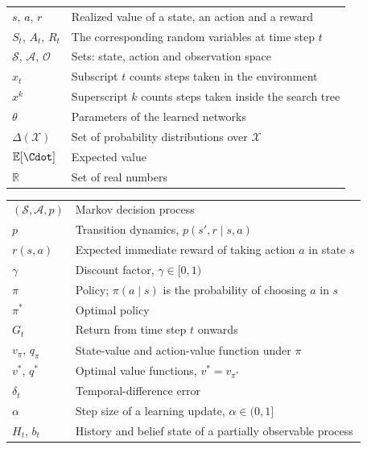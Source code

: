 %



\begin{tabular}{p{2.5cm} p{11cm}}
$s$, $a$, $r$ & Realized value of a state, an action and a reward \\
$S_t$, $A_t$, $R_t$ & The corresponding random variables at time step $t$ \\
$\mathcal{S}$, $\mathcal{A}$, $\mathcal{O}$ & Sets: state, action and observation space \\
$x_t$ & Subscript $t$ counts steps taken in the environment \\
$x^k$ & Superscript $k$ counts steps taken inside the search tree \\
$\theta$ & Parameters of the learned networks \\
$\Delta(\mathcal{X})$ & Set of probability distributions over $\mathcal{X}$ \\
$\mathbb{E}[\Cdot]$ & Expected value \\
$\mathbb{R}$ & Set of real numbers \\
\end{tabular}


\begin{tabular}{p{2.5cm} p{11cm}}
$(\mathcal{S},\mathcal{A},p)$ & Markov decision process \\
$p$ & Transition dynamics, $p(s',r \mid s,a)$ \\
$r(s,a)$ & Expected immediate reward of taking action $a$ in state $s$ \\
$\gamma$ & Discount factor, $\gamma\in[0,1)$ \\
$\pi$ & Policy; $\pi(a \mid s)$ is the probability of choosing $a$ in $s$ \\
$\pi^*$ & Optimal policy \\
$G_t$ & Return from time step $t$ onwards \\
$v_\pi$, $q_\pi$ & State-value and action-value function under $\pi$ \\
$v^*$, $q^*$ & Optimal value functions, $v^*=v_{\pi^*}$ \\
$\delta_t$ & Temporal-difference error \\
$\alpha$ & Step size of a learning update, $\alpha\in(0,1]$ \\
$H_t$, $b_t$ & History and belief state of a partially observable process \\
\end{tabular}

